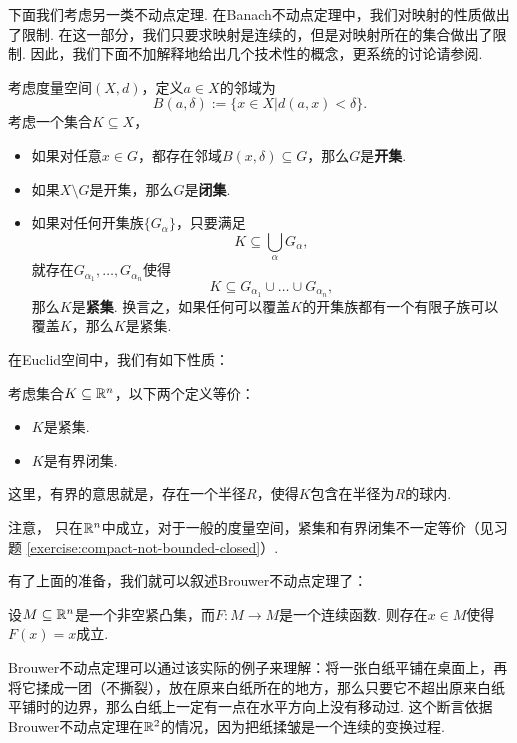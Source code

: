 下面我们考虑另一类不动点定理. 在Banach不动点定理中，我们对映射的性质做出了限制. 在这一部分，我们只要求映射是连续的，但是对映射所在的集合做出了限制. 因此，我们下面不加解释地给出几个技术性的概念，更系统的讨论请参阅.

\begin{definition}[开集、闭集和紧集]
    考虑度量空间$(X,d)$，定义$a\in X$的邻域为
    \[B(a,\delta):=\{x\in X|d(a,x)<\delta\}.\]
    考虑一个集合$K\subseteq X$，
\begin{itemize}
    \item 如果对任意$x\in G$，都存在邻域$B(x,\delta)\subseteq G$，那么$G$是\textbf{开集}.
    \item 如果$X\setminus G$是开集，那么$G$是\textbf{闭集}.
    \item 如果对任何开集族$\{G_\alpha\}$，只要满足
    \[K\subseteq \bigcup_\alpha G_\alpha,\]
    就存在$G_{\alpha_1},\dots,G_{\alpha_n}$使得
    \[K\subseteq G_{\alpha_1}\cup\dots\cup G_{\alpha_n},\]
    那么$K$是\textbf{紧集}. 换言之，如果任何可以覆盖$K$的开集族都有一个有限子族可以覆盖$K$，那么$K$是紧集.
\end{itemize}
\end{definition}

在Euclid空间中，我们有如下性质：

\begin{theorem}\label{thm:compact-set-iff-bounded-closed}
    考虑集合$K\subseteq\mathbb{R}^n$，以下两个定义等价：
    \begin{itemize}
        \item $K$是紧集.
        \item $K$是有界闭集.
    \end{itemize}
\end{theorem}
这里，有界的意思就是，存在一个半径$R$，使得$K$包含在半径为$R$的球内. 

注意， 只在$\mathbb{R}^n$中成立，对于一般的度量空间，紧集和有界闭集不一定等价（见习题 \ref{exercise:compact-not-bounded-closed}）. 

有了上面的准备，我们就可以叙述Brouwer不动点定理了：

\begin{theorem}[Brouwer不动点定理]
    设$M\subseteq\mathbb{R}^n$是一个非空紧凸集，而$F:M\to M$是一个连续函数. 则存在$x\in M$使得$F(x)=x$成立.
\end{theorem}

Brouwer不动点定理可以通过该实际的例子来理解：将一张白纸平铺在桌面上，再将它揉成一团（不撕裂），放在原来白纸所在的地方，那么只要它不超出原来白纸平铺时的边界，那么白纸上一定有一点在水平方向上没有移动过. 这个断言依据Brouwer不动点定理在$\mathbb{R}^2$的情况，因为把纸揉皱是一个连续的变换过程.

